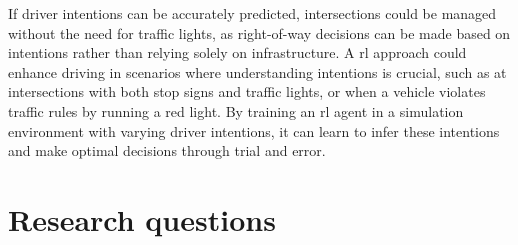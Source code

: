 If driver intentions can be accurately predicted, intersections could be managed without the need for traffic lights, as right-of-way decisions can be made based on intentions rather than relying solely on infrastructure. A \gls{rl} approach could enhance driving in scenarios where understanding intentions is crucial, such as at intersections with both stop signs and traffic lights, or when a vehicle violates traffic rules by running a red light. By training an \gls{rl} agent in a simulation environment with varying driver intentions, it can learn to infer these intentions and make optimal decisions through trial and error.

\section{Research questions}
\label{sec:research_questions}


	
